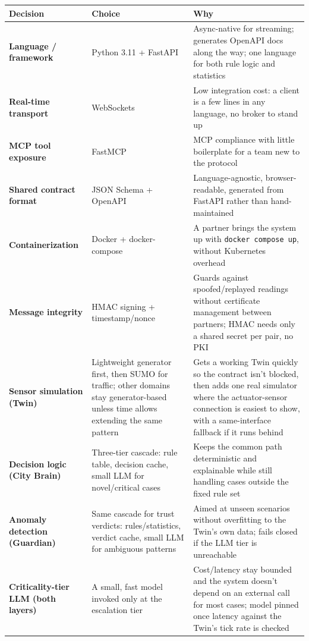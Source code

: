 \documentclass[10pt,letterpaper]{article}
\begin{document}
\begin{longtable}{p{1.6in} p{1.6in} p{2.9in}}
\toprule
\textbf{Decision} & \textbf{Choice} & \textbf{Why} \\
\midrule
\endhead
\textbf{Language / framework} & Python 3.11 + FastAPI & Async-native for streaming; generates OpenAPI docs along the way; one language for both rule logic and statistics \\
\textbf{Real-time transport} & WebSockets & Low integration cost: a client is a few lines in any language, no broker to stand up \\
\textbf{MCP tool exposure} & FastMCP & MCP compliance with little boilerplate for a team new to the protocol \\
\textbf{Shared contract format} & JSON Schema + OpenAPI & Language-agnostic, browser-readable, generated from FastAPI rather than hand-maintained \\
\textbf{Containerization} & Docker + docker-compose & A partner brings the system up with \texttt{docker compose up}, without Kubernetes overhead \\
\textbf{Message integrity} & HMAC signing + timestamp/nonce & Guards against spoofed/replayed readings without certificate management between partners; HMAC needs only a shared secret per pair, no PKI \\
\textbf{Sensor simulation (Twin)} & Lightweight generator first, then SUMO for traffic; other domains stay generator-based unless time allows extending the same pattern & Gets a working Twin quickly so the contract isn't blocked, then adds one real simulator where the actuator-sensor connection is easiest to show, with a same-interface fallback if it runs behind \\
\textbf{Decision logic (City Brain)} & Three-tier cascade: rule table, decision cache, small LLM for novel/critical cases & Keeps the common path deterministic and explainable while still handling cases outside the fixed rule set \\
\textbf{Anomaly detection (Guardian)} & Same cascade for trust verdicts: rules/statistics, verdict cache, small LLM for ambiguous patterns & Aimed at unseen scenarios without overfitting to the Twin's own data; fails closed if the LLM tier is unreachable \\
\textbf{Criticality-tier LLM (both layers)} & A small, fast model invoked only at the escalation tier & Cost/latency stay bounded and the system doesn't depend on an external call for most cases; model pinned once latency against the Twin's tick rate is checked \\
\bottomrule
\end{longtable}
\end{document}
